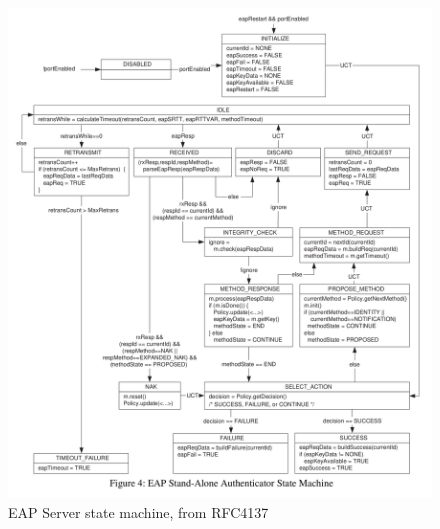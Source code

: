 \documentclass{amsart}
\begin{document}
\begin{figure}
  \centering \includegraphics{res/eap-server-state-machine-rfc4137.png}
  \caption{EAP Server state machine, from RFC4137}
\end{figure}
\end{document}

